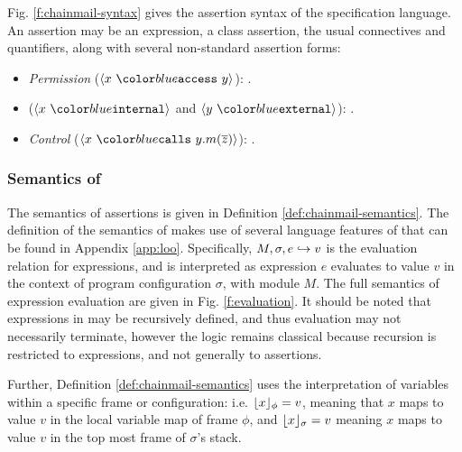 
Fig. \ref{f:chainmail-syntax} gives the assertion syntax of the \Chainmail specification language.
An assertion may be an expression, a class assertion, the usual connectives and quantifiers, along 
with several non-standard assertion forms:
\begin{itemize}
\item
\emph{Permission} ($\access{x}{y}$): %
  .
\item
{} ($\internal{x}$ and $\external{y}$): %
 .
\item
\emph{Control} ($\calls{x}{y}{m}{\overline{z}}$): 
.
\end{itemize}

\subsubsection{Semantics of \SpecO}
The semantics of \SpecO assertions is given in Definition \ref{def:chainmail-semantics}. 
The definition of the semantics of \Chainmail makes use of several language features of 
\Loo that can be found in Appendix \ref{app:loo}. Specifically, $M, \sigma, e \hookrightarrow v$
is the evaluation relation for expressions, and is interpreted as expression $e$ evaluates
to value $v$ in the context of program configuration $\sigma$, with module $M$. The full
semantics of expression evaluation are given in Fig. \ref{f:evaluation}. It should 
be noted that expressions in \Loo may be recursively defined, and thus evaluation may not
necessarily terminate, however the logic remains classical because recursion is restricted
to expressions, and not generally to assertions.

Further, Definition \ref{def:chainmail-semantics} uses the interpretation of variables
within a specific frame or configuration: i.e. $\lfloor x \rfloor_{\phi} = v$, meaning that $x$ maps to
value $v$ in the local variable map of frame $\phi$, and $\lfloor x \rfloor_{\sigma} = v$ meaning $x$ 
maps to value $v$ in the top most frame of $\sigma$'s stack.

